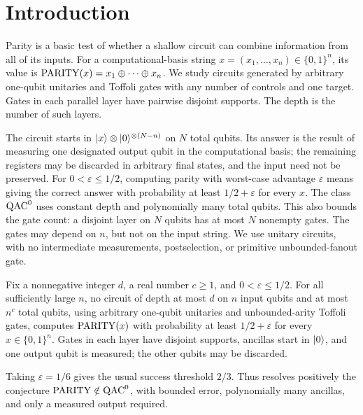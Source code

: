 \section{Introduction}
\label{sec:introduction}

Parity is a basic test of whether a shallow circuit can combine
information from all of its inputs. For a computational-basis string
$x=(x_1,\ldots,x_n)\in\{0,1\}^n$, its value is
$\operatorname{PARITY}(x)=x_1\oplus\cdots\oplus x_n$. We study circuits generated
by arbitrary one-qubit unitaries and Toffoli gates with any number of
controls and one target. Gates in each parallel layer have pairwise
disjoint supports. The depth is the number of such layers.

The circuit starts in $\lvert x\rangle\otimes\lvert 0\rangle^{\otimes(N-n)}$ on $N$
total qubits. Its answer is the result of measuring one designated output
qubit in the computational basis; the remaining registers may be
discarded in arbitrary final states, and the input need not be preserved.
For $0<\varepsilon\le1/2$, computing parity with worst-case advantage
$\varepsilon$ means giving the correct answer with probability at least
$1/2+\varepsilon$ for every $x$. The class $\mathrm{QAC}^0$ uses constant depth
and polynomially many total qubits. This also bounds the gate count:
a disjoint layer on $N$ qubits has at most $N$ nonempty gates.
The gates may depend on $n$, but not on the input string.
We use unitary circuits, with no intermediate measurements,
postselection, or primitive unbounded-fanout gate.

\begin{theorem}
\label{thm:parity}
Fix a nonnegative integer \(d\), a real number \(c\ge1\), and
\(0<\varepsilon\le1/2\). For all sufficiently large \(n\), no circuit
of depth at most \(d\) on \(n\) input qubits and at most \(n^c\) total
qubits, using arbitrary one-qubit unitaries and unbounded-arity Toffoli
gates, computes \(\operatorname{PARITY}(x)\) with probability at least
\(1/2+\varepsilon\) for every \(x\in\{0,1\}^n\).
Gates in each layer have disjoint supports, ancillas start in \(\lvert 0\rangle\),
and one output qubit is measured; the other qubits may be discarded.
\end{theorem}

Taking \(\varepsilon=1/6\) gives the usual success threshold \(2/3\).
Thus  resolves positively the conjecture
\(\operatorname{PARITY}\notin\mathrm{QAC}^0\), with bounded error, polynomially many ancillas,
and only a measured output required.

